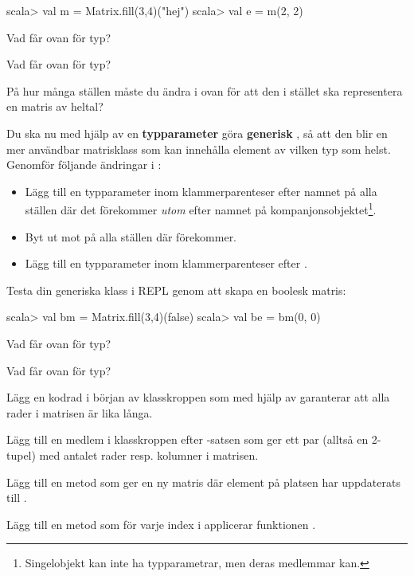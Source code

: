 \begin{REPLnonum}
scala> val m = Matrix.fill(3,4)("hej")
scala> val e = m(2, 2)
\end{REPLnonum}

\Subtask Vad får  ovan för typ?

\Subtask Vad får  ovan för typ?

\Subtask På hur många ställen måste du ändra i  ovan för att den i stället ska representera en matris av heltal?

\Subtask Du ska nu med hjälp av en \textbf{typparameter} göra  \textbf{generisk} , så att den blir en mer användbar matrisklass som kan innehålla element av vilken typ som helst. Genomför följande ändringar i :

\begin{itemize}[noitemsep, nolistsep]
  \item Lägg till en typparameter  inom klammerparenteser efter namnet  på alla ställen där det förekommer \emph{utom} efter namnet på kompanjonsobjektet\footnote{Singelobjekt kan inte ha typparametrar, men deras medlemmar kan.}.
  \item Byt ut  mot  på alla ställen där  förekommer.
  \item Lägg till en typparameter  inom klammerparenteser efter .
\end{itemize}
Testa din generiska klass i REPL genom att skapa en boolesk matris:
\begin{REPLnonum}
scala> val bm = Matrix.fill(3,4)(false)
scala> val be = bm(0, 0)
\end{REPLnonum}

\Subtask Vad får  ovan för typ?

\Subtask Vad får  ovan för typ?

\Subtask Lägg en kodrad i början av klasskroppen som med hjälp av  garanterar att alla rader i matrisen är lika långa.

\Subtask Lägg till en medlem  i klasskroppen efter -satsen som ger ett par (alltså en 2-tupel) med antalet rader resp. kolumner i matrisen.

\Subtask Lägg till en metod  som ger en ny matris där element på platsen  har uppdaterats till .

\Subtask Lägg till en metod  som för varje index i  applicerar funktionen .

